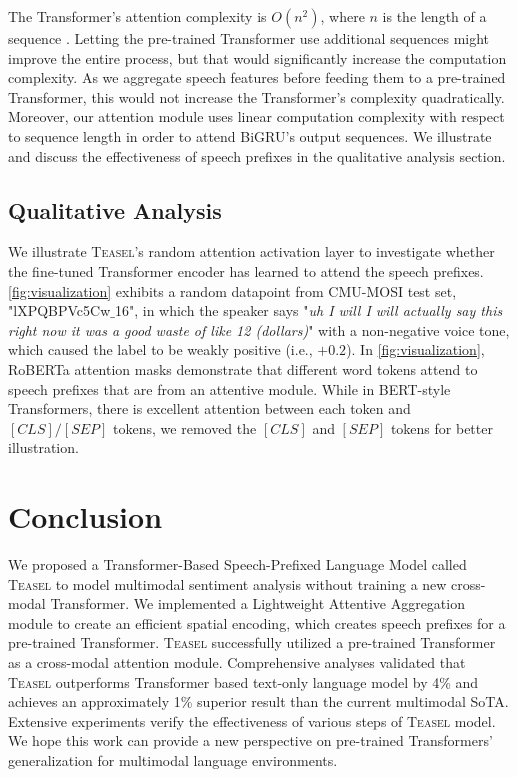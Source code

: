 \documentclass[letterpaper]{article} \usepackage{spconf,amsmath,graphicx}
\newcommand{\teasel}{\textsc{Teasel }}
\newcommand{\teaselns}{\textsc{Teasel}}
\begin{document}
The Transformer's attention complexity is $O(n^2)$, where $n$ is the length of a sequence \cite{devlin2018bert}. Letting the pre-trained Transformer use additional sequences might improve the entire process, but that would significantly increase the computation complexity. As we aggregate speech features before feeding them to a pre-trained Transformer, this would not increase the Transformer's complexity quadratically. Moreover, our attention module uses linear computation complexity with respect to sequence length in order to attend BiGRU's output sequences. We illustrate and discuss the effectiveness of speech prefixes in the qualitative analysis section.




\subsection{Qualitative Analysis}

We illustrate \teaselns's random attention activation layer to investigate whether the fine-tuned Transformer encoder has learned to attend the speech prefixes. \autoref{fig:visualization} exhibits a random datapoint from CMU-MOSI test set, "lXPQBPVc5Cw$\_$16", in which the speaker says "\textit{uh I will I will actually say this right now it was a good waste of like 12 (dollars)}" with a non-negative voice tone, which caused the label to be weakly positive (i.e., $+0.2$). In \autoref{fig:visualization}, RoBERTa attention masks demonstrate that different word tokens attend to speech prefixes that are from an attentive module. While in BERT-style Transformers, there is excellent attention between each token and $[CLS]/[SEP]$ tokens, we removed the $[CLS]$ and $[SEP]$ tokens for better illustration.


\section{Conclusion}
\label{sec:conclusion}

We proposed a Transformer-Based Speech-Prefixed Language Model called \teasel to model multimodal sentiment analysis without training a new cross-modal Transformer. We implemented a Lightweight Attentive Aggregation module to create an efficient spatial encoding, which creates speech prefixes for a pre-trained Transformer. \teasel successfully utilized a pre-trained Transformer as a cross-modal attention module. Comprehensive analyses validated that \teasel outperforms Transformer based text-only language model by 4\% and achieves an approximately 1\% superior result than the current multimodal SoTA. Extensive experiments verify the effectiveness of various steps of \teasel model. We hope this work can provide a new perspective on pre-trained Transformers' generalization for multimodal language environments.




\end{document}
